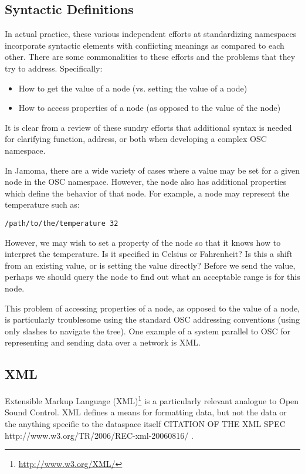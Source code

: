 \documentclass{sig-alternate}
\begin{document}
\subsection{Syntactic Definitions} %
\label{sub:litterature_review}
   
In actual practice, these various independent efforts at standardizing namespaces incorporate syntactic elements with conflicting meanings as compared to each other.  There are some commonalities to these efforts and the problems that they try to address.  Specifically:
\begin{itemize}
	\item How to get the value of a node (vs. setting the value of a node) 
	\item How to access properties of a node (as opposed to the value of the node)
\end{itemize}

It is clear from a review of these sundry efforts that additional syntax is needed for clarifying function, address, or both when developing a complex OSC namespace.

In Jamoma, there are a wide variety of cases where a value may be set for a given node in the OSC namespace.  However, the node also has additional properties which define the behavior of that node.  For example, a node may represent the temperature such as:

\texttt{/path/to/the/temperature 32}

However, we may wish to set a property of the node so that it knows how to interpret the temperature.  Is it specified in Celsius or Fahrenheit?  Is this a shift from an existing value, or is setting the value directly?  Before we send the value, perhaps we should query the node to find out what an acceptable range is for this node.

This problem of accessing properties of a node, as opposed to the value of a node, is particularly troublesome using the standard OSC addressing conventions (using only slashes to navigate the tree).  One example of a system parallel to OSC for representing and sending data over a network is XML.


\subsection{XML} %
\label{sub:xml}

Extensible Markup Language (XML)\footnote{\url{http://www.w3.org/XML/}} is a particularly relevant analogue to Open Sound Control.  XML defines a means for formatting data, but not the data or the anything specific to the dataspace itself CITATION OF THE XML SPEC http://www.w3.org/TR/2006/REC-xml-20060816/ .  
\end{document}
